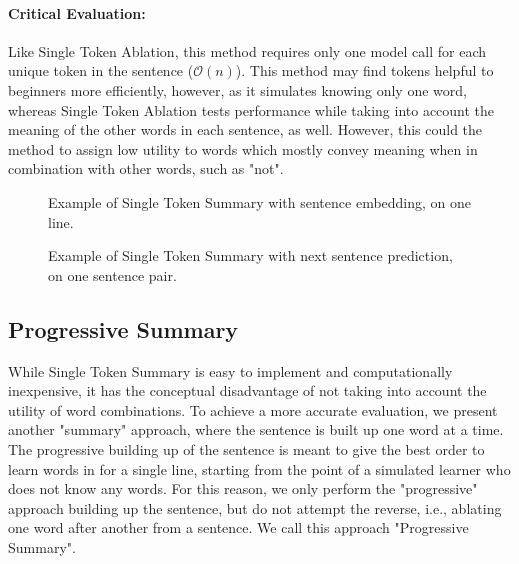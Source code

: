 \paragraph{Critical Evaluation:}
Like Single Token Ablation, this method requires only one model call for each unique token in the sentence ($\mathcal{O}(n)$).
This method may find tokens helpful to beginners more efficiently, however, as it simulates knowing only one word, whereas Single Token Ablation tests performance while taking into account the meaning of the other words in each sentence, as well.
However, this could the method to assign low utility to words which mostly convey meaning when in combination with other words, such as "not".

\begin{figure}[H]
	
	\caption{Example of Single Token Summary with sentence embedding, on one line.}
	\label{fig:single-token-summary}
\end{figure}

\begin{figure}[H]
	
	\caption{Example of Single Token Summary with next sentence prediction, on one sentence pair.}
	\label{fig:single-token-summary-nsp}
\end{figure}


\subsection{Progressive Summary}
While Single Token Summary is easy to implement and computationally inexpensive, it has the conceptual disadvantage of not taking into account the utility of word combinations.
To achieve a more accurate evaluation, we present another "summary" approach, where the sentence is built up one word at a time.
The progressive building up of the sentence is meant to give the best order to learn words in for a single line, starting from the point of a simulated learner who does not know any words.
For this reason, we only perform the "progressive" approach building up the sentence, but do not attempt the reverse, i.e., ablating one word after another from a sentence.
We call this approach "Progressive Summary".


